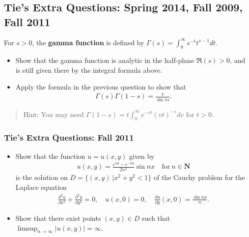 \hypertarget{ties-extra-questions-spring-2014-fall-2009-fall-2011}{%
\subsection{Tie's Extra Questions: Spring 2014, Fall 2009, Fall
2011}\label{ties-extra-questions-spring-2014-fall-2009-fall-2011}}

For \(s>0\), the \textbf{gamma function} is defined by
\(\displaystyle{\Gamma(s)=\int_0^{\infty} e^{-t}t^{s-1} dt}\).

\begin{itemize}
\item
  Show that the gamma function is analytic in the half-plane
  \(\Re (s)>0\), and is still given there by the integral formula above.
\item
  Apply the formula in the previous question to show that
  \begin{align*}
  \Gamma(s)\Gamma(1-s)=\frac{\pi}{\sin \pi s}
  .\end{align*}
\end{itemize}

\begin{quote}
Hint: You may need
\(\displaystyle{\Gamma(1-s)=t \int_0^{\infty}e^{-vt}(vt)^{-s} dv}\) for
\(t>0\).
\end{quote}

\hypertarget{ties-extra-questions-fall-2011-1}{%
\subsubsection{Tie's Extra Questions: Fall
2011}\label{ties-extra-questions-fall-2011-1}}

\begin{problem}[?]

\envlist

\begin{itemize}
\item
  Show that the function \(u=u(x,y)\) given by
  \begin{align*}u(x,y)=\frac{e^{ny}-e^{-ny}}{2n^2}\sin nx\quad \text{for}\ n\in {\mathbf N}\end{align*}
  is the solution on \(D=\{(x,y)\ | x^2+y^2<1\}\) of the Cauchy problem
  for the Laplace equation
  \begin{align*}\frac{\partial ^2u}{\partial x^2}+\frac{\partial ^2u}{\partial y^2}=0,\quad
  u(x,0)=0,\quad \frac{\partial u}{\partial y}(x,0)=\frac{\sin nx}{n}.\end{align*}
\item
  Show that there exist points \((x,y)\in D\) such that
  \(\displaystyle{\limsup_{n\to\infty} |u(x,y)|=\infty}\).
\end{itemize}

\end{problem}



\newpage
\printbibliography[title=Bibliography]



